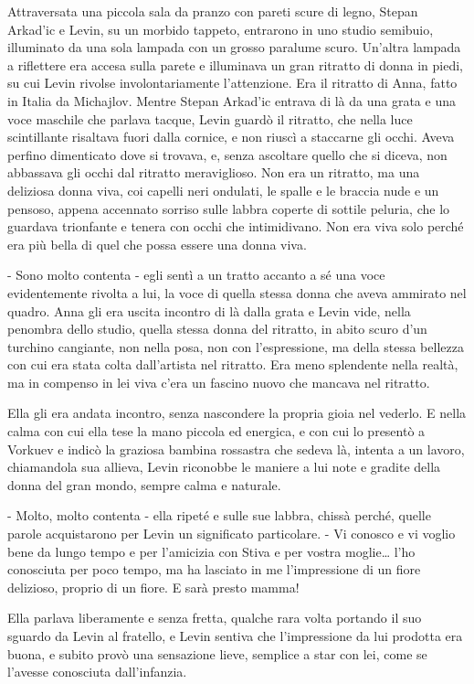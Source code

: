 Attraversata una piccola sala da pranzo con pareti scure di legno, Stepan Arkad'ic e Levin, su un morbido tappeto, entrarono in uno studio semibuio, illuminato da una sola lampada con un grosso paralume scuro. Un'altra lampada a riflettere era accesa sulla parete e illuminava un gran ritratto di donna in piedi, su cui Levin rivolse involontariamente l'attenzione. Era il ritratto di Anna, fatto in Italia da Michajlov. Mentre Stepan Arkad'ic entrava di là da una grata e una voce maschile che parlava tacque, Levin guardò il ritratto, che nella luce scintillante risaltava fuori dalla cornice, e non riuscì a staccarne gli occhi. Aveva perfino dimenticato dove si trovava, e, senza ascoltare quello che si diceva, non abbassava gli occhi dal ritratto meraviglioso. Non era un ritratto, ma una deliziosa donna viva, coi capelli neri ondulati, le spalle e le braccia nude e un pensoso, appena accennato sorriso sulle labbra coperte di sottile peluria, che lo guardava trionfante e tenera con occhi che intimidivano. Non era viva solo perché era più bella di quel che possa essere una donna viva. 

- Sono molto contenta - egli sentì a un tratto accanto a sé una voce evidentemente rivolta a lui, la voce di quella stessa donna che aveva ammirato nel quadro. Anna gli era uscita incontro di là dalla grata e Levin vide, nella penombra dello studio, quella stessa donna del ritratto, in abito scuro d'un turchino cangiante, non nella posa, non con l'espressione, ma della stessa bellezza con cui era stata colta dall'artista nel ritratto. Era meno splendente nella realtà, ma in compenso in lei viva c'era un fascino nuovo che mancava nel ritratto. 

Ella gli era andata incontro, senza nascondere la propria gioia nel vederlo. E nella calma con cui ella tese la mano piccola ed energica, e con cui lo presentò a Vorkuev e indicò la graziosa bambina rossastra che sedeva là, intenta a un lavoro, chiamandola sua allieva, Levin riconobbe le maniere a lui note e gradite della donna del gran mondo, sempre calma e naturale. 

- Molto, molto contenta - ella ripeté e sulle sue labbra, chissà perché, quelle parole acquistarono per Levin un significato particolare. - Vi conosco e vi voglio bene da lungo tempo e per l'amicizia con Stiva e per vostra moglie\ldots{} l'ho conosciuta per poco tempo, ma ha lasciato in me l'impressione di un fiore delizioso, proprio di un fiore. E sarà presto mamma! 

Ella parlava liberamente e senza fretta, qualche rara volta portando il suo sguardo da Levin al fratello, e Levin sentiva che l'impressione da lui prodotta era buona, e subito provò una sensazione lieve, semplice a star con lei, come se l'avesse conosciuta dall'infanzia. 

